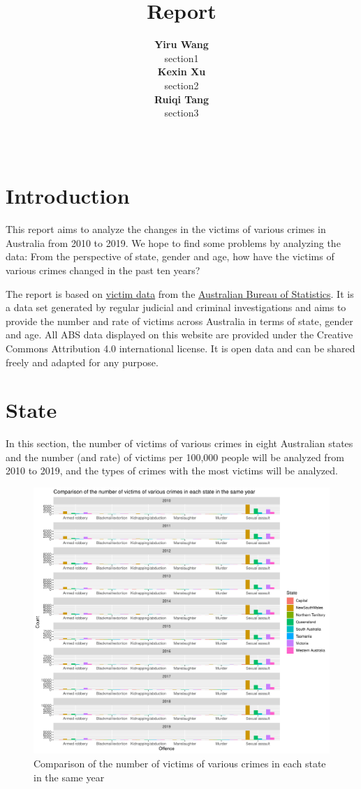 \documentclass[11pt,a4paper,]{article}
\title{Report}
\author{\sf\Large\textbf{ Yiru Wang}\\ {\sf\large section1\\[0.5cm]} \sf\Large\textbf{ Kexin Xu}\\ {\sf\large section2\\[0.5cm]} \sf\Large\textbf{ Ruiqi Tang}\\ {\sf\large section3\\[0.5cm]}}
\date{\sf\Date~\Month~\Year}
\makeatletter
\def\titlepage{\front{\expandafter{\@title}}{\@author}{\@organization}}
\makeatother
\begin{document}
\titlepage

\clearpage

\section*{Introduction}

This report aims to analyze the changes in the victims of various crimes in Australia from 2010 to 2019. We hope to find some problems by analyzing the data: From the perspective of state, gender and age, how have the victims of various crimes changed in the past ten years?

The report is based on \href{https://www.abs.gov.au/statistics/people/crime-and-justice/recorded-crime-victims/latest-release}{victim data} from the \href{https://www.abs.gov.au/}{Australian Bureau of Statistics}. It is a data set generated by regular judicial and criminal investigations and aims to provide the number and rate of victims across Australia in terms of state, gender and age. All ABS data displayed on this website are provided under the Creative Commons Attribution 4.0 international license. It is open data and can be shared freely and adapted for any purpose.

\clearpage

\section*{State}

In this section, the number of victims of various crimes in eight Australian states and the number (and rate) of victims per 100,000 people will be analyzed from 2010 to 2019, and the types of crimes with the most victims will be analyzed.

\begin{figure}
\centering
\includegraphics{report_files/figure-latex/plot1-1.pdf}
\caption{\label{fig:plot1}Comparison of the number of victims of various crimes in each state in the same year}
\end{figure}
\end{document}
